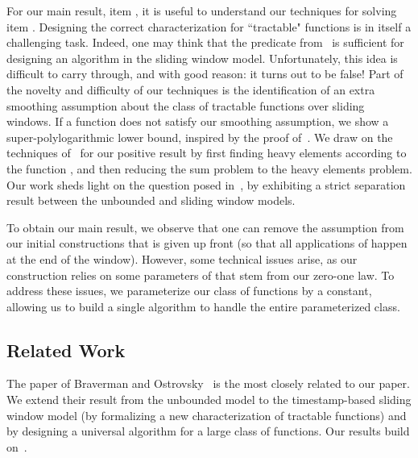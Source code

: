 \documentclass[11pt]{article}
\begin{document}
For our main result, item , it is useful to understand our techniques for solving
item .  Designing the correct characterization for ``tractable" functions is in itself a challenging task.
Indeed, one may think that the predicate from~\cite{BO10} is sufficient for designing an algorithm
in the sliding window model.  Unfortunately, this idea is difficult to carry through, and with good reason:
it turns out to be false!  Part of the novelty and difficulty of our techniques is the identification of an extra smoothing
assumption about the class of tractable functions over sliding windows.  If a function
does not satisfy our smoothing assumption, we show a super-polylogarithmic lower bound,
inspired by the proof of~\cite{DGIM02}.
We draw on the techniques of~\cite{BO10,BO13,IW05} for our positive result by first finding
heavy elements according to the function , and then reducing the sum problem to the heavy elements
problem.  Our work sheds light on the question posed in~\cite{sub20},
by exhibiting a strict separation result between the unbounded and sliding window models.

To obtain our main result, we observe that one can remove the assumption from our initial constructions
that  is given up front (so that all applications of  happen at the end of the window).  However,
some technical issues arise, as our construction relies on some parameters of  that stem from our
zero-one law.  To address these issues, we parameterize our class of functions  by a constant,
allowing us to build a single algorithm to handle the entire parameterized class.

\subsection{Related Work}
The paper of Braverman and Ostrovsky~\cite{BO10} is the most closely related to our paper.
We extend their result from the unbounded model to the timestamp-based sliding window model
(by formalizing a new characterization of tractable functions) and by designing a universal
algorithm for a large class of functions.  Our results build on~\cite{BO10,BO13,IW05}.
\end{document}
